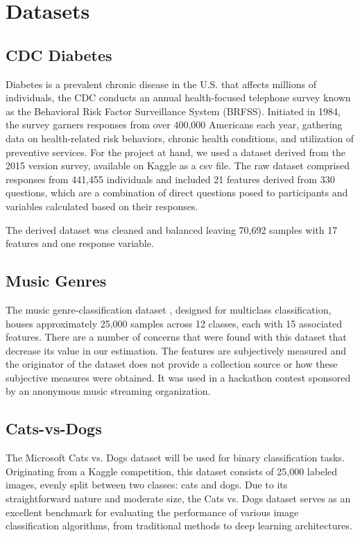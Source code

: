 \documentclass[journal]{IEEEtran}
\begin{document}
	\section{Datasets}
	\label{sec:dataset}
	
	\subsection{CDC Diabetes}
	\cite{cdc2022}
	Diabetes is a prevalent chronic disease in the U.S. that affects millions of individuals, 
	the CDC conducts an annual health-focused telephone survey known as the Behavioral Risk Factor Surveillance System (BRFSS). 
	Initiated in 1984, the survey garners responses from over 400,000 Americans each year, gathering data on health-related risk behaviors, 
	chronic health conditions, and utilization of preventive services. For the project at hand, we used a dataset derived from the 2015 version survey, 
	available on Kaggle as a csv file. The raw dataset comprised responses from 441,455 individuals and included 21 features derived from 330 questions, 
	which are a combination of direct questions posed to participants and variables calculated based on their responses.

	The derived dataset was cleaned and balanced leaving 70,692 samples with 17 features and one response variable. 
	
	\subsection{Music Genres}
	The music genre-classification dataset \cite{Music_Genre_Classification}, designed for multiclass classification, 
	houses approximately 25,000 samples across 12 classes, each with 15 associated features.
	There are a number of concerns that were found with this dataset that decrease its value in our estimation.
	The features are subjectively measured and the originator of the dataset does not provide a 
	collection source or how these subjective measures were obtained.
	It was used in a hackathon contest sponsored by an anonymous music streaming organization.
	
	\subsection{Cats-vs-Dogs}	
	The Microsoft Cats vs. Dogs dataset \cite{Cats-vs-Dogs} will be used for binary classification tasks. 
	Originating from a Kaggle competition, this dataset consists of 25,000 labeled images, evenly split between two classes: cats and dogs. 
	Due to its straightforward nature and moderate size, the Cats vs. Dogs dataset serves as an excellent benchmark for evaluating the 
	performance of various image classification algorithms, from traditional methods to deep learning architectures.
	
\end{document}
